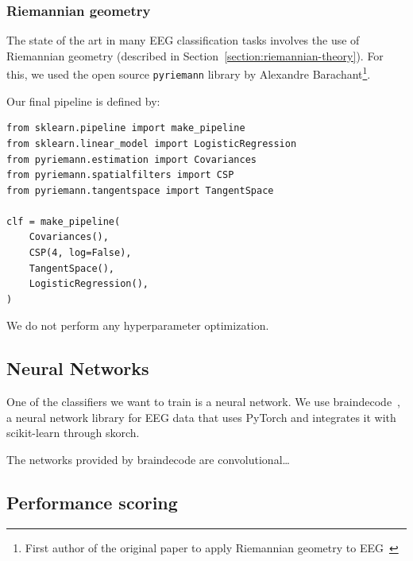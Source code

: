 
        \subsubsection{Riemannian geometry}

            The state of the art in many EEG classification tasks involves the use of Riemannian geometry (described in Section~\ref{section:riemannian-theory}). For this, we used the open source \texttt{pyriemann} library by Alexandre Barachant\footnote{First author of the original paper to apply Riemannian geometry to EEG~\cite{barachant_classification_2013}}.

            Our final pipeline is defined by:

\begin{verbatim}
from sklearn.pipeline import make_pipeline
from sklearn.linear_model import LogisticRegression
from pyriemann.estimation import Covariances
from pyriemann.spatialfilters import CSP
from pyriemann.tangentspace import TangentSpace

clf = make_pipeline(
    Covariances(),
    CSP(4, log=False),
    TangentSpace(),
    LogisticRegression(),
)
\end{verbatim}

            We do not perform any hyperparameter optimization.


    \subsection{Neural Networks}


        One of the classifiers we want to train is a neural network. We use braindecode~\cite{schirrmeister_deep_2017}\cite{noauthor_braindecode_2021}, a neural network library for EEG data that uses PyTorch and integrates it with scikit-learn through skorch.

        The networks provided by braindecode are convolutional\ldots

    \subsection{Performance scoring}

